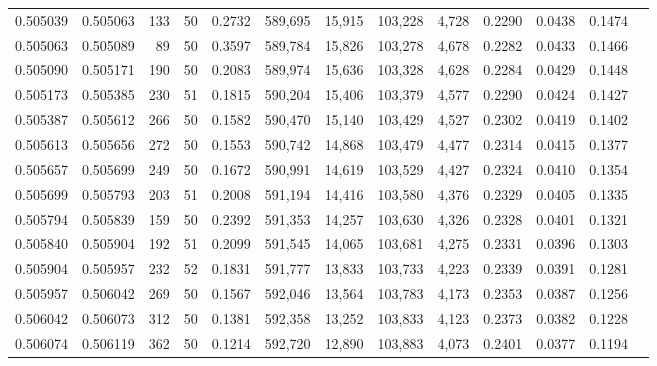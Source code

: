 \begin{tabular}{rrrrrrrrrrrrr}
0.505039 & 0.505063 & 133 &  50 &                                     0.2732 & 589,695 &  15,915 & 103,228 &   4,728 & 0.2290 & 0.0438 & 0.1474 \\
0.505063 & 0.505089 &  89 &  50 &                                     0.3597 & 589,784 &  15,826 & 103,278 &   4,678 & 0.2282 & 0.0433 & 0.1466 \\
0.505090 & 0.505171 & 190 &  50 &                                     0.2083 & 589,974 &  15,636 & 103,328 &   4,628 & 0.2284 & 0.0429 & 0.1448 \\
0.505173 & 0.505385 & 230 &  51 &                                     0.1815 & 590,204 &  15,406 & 103,379 &   4,577 & 0.2290 & 0.0424 & 0.1427 \\
0.505387 & 0.505612 & 266 &  50 &                                     0.1582 & 590,470 &  15,140 & 103,429 &   4,527 & 0.2302 & 0.0419 & 0.1402 \\
0.505613 & 0.505656 & 272 &  50 &                                     0.1553 & 590,742 &  14,868 & 103,479 &   4,477 & 0.2314 & 0.0415 & 0.1377 \\
0.505657 & 0.505699 & 249 &  50 &                                     0.1672 & 590,991 &  14,619 & 103,529 &   4,427 & 0.2324 & 0.0410 & 0.1354 \\
0.505699 & 0.505793 & 203 &  51 &                                     0.2008 & 591,194 &  14,416 & 103,580 &   4,376 & 0.2329 & 0.0405 & 0.1335 \\
0.505794 & 0.505839 & 159 &  50 &                                     0.2392 & 591,353 &  14,257 & 103,630 &   4,326 & 0.2328 & 0.0401 & 0.1321 \\
0.505840 & 0.505904 & 192 &  51 &                                     0.2099 & 591,545 &  14,065 & 103,681 &   4,275 & 0.2331 & 0.0396 & 0.1303 \\
0.505904 & 0.505957 & 232 &  52 &                                     0.1831 & 591,777 &  13,833 & 103,733 &   4,223 & 0.2339 & 0.0391 & 0.1281 \\
0.505957 & 0.506042 & 269 &  50 &                                     0.1567 & 592,046 &  13,564 & 103,783 &   4,173 & 0.2353 & 0.0387 & 0.1256 \\
0.506042 & 0.506073 & 312 &  50 &                                     0.1381 & 592,358 &  13,252 & 103,833 &   4,123 & 0.2373 & 0.0382 & 0.1228 \\
0.506074 & 0.506119 & 362 &  50 &                                     0.1214 & 592,720 &  12,890 & 103,883 &   4,073 & 0.2401 & 0.0377 & 0.1194 \\

\end{tabular}

